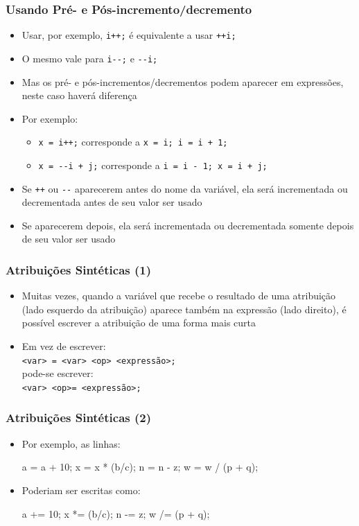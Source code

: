 \documentclass[xcolor={dvipsnames,table},aspectratio=169]{beamer}
\begin{document}
\begin{frame}\frametitle{Usando Pré- e Pós-incremento/decremento}
\begin{itemize}
	\item Usar, por exemplo, \texttt{i++;} é equivalente a usar \texttt{++i;}
	\item O mesmo vale para \texttt{i-{}-;} e \texttt{-{}-i;}
	\item Mas os pré- e pós-incrementos/decrementos podem aparecer em expressões, neste caso haverá diferença
	\item Por exemplo:
	\begin{itemize}
		\item \texttt{x = i++;} corresponde a \texttt{x = i; i = i + 1;}
		\item \texttt{x = -{}-i + j;} corresponde a \texttt{i = i - 1; x = i + j;}
	\end{itemize}
	\item Se \texttt{++} ou \texttt{-{}-} aparecerem antes do nome da variável, ela será incrementada ou decrementada antes de seu valor ser usado
	\item Se aparecerem depois, ela será incrementada ou decrementada somente depois de seu valor ser usado
\end{itemize}
\end{frame}

\begin{frame}[fragile]\frametitle{Atribuições Sintéticas (1)}
\begin{itemize}
	\item Muitas vezes, quando a variável que recebe o resultado de uma atribuição (lado esquerdo da atribuição) aparece também na expressão (lado direito), é possível escrever a atribuição de uma forma mais curta
	\item Em vez de escrever:\\ \texttt{<var> = <var> <op> <expressão>;}\\pode-se escrever:\\ \texttt{<var> <op>= <expressão>;}
\end{itemize}
\end{frame}

\begin{frame}[fragile]\frametitle{Atribuições Sintéticas (2)}
\begin{itemize}
	\item Por exemplo, as linhas:
\begin{javacode}
a = a + 10;
x = x * (b/c);
n = n - z;
w = w / (p + q);
\end{javacode}
	\item Poderiam ser escritas como:
\begin{javacode}
a += 10;
x *= (b/c);
n -= z;
w /= (p + q);
\end{javacode}
\end{itemize}
\end{frame}
\end{document}
